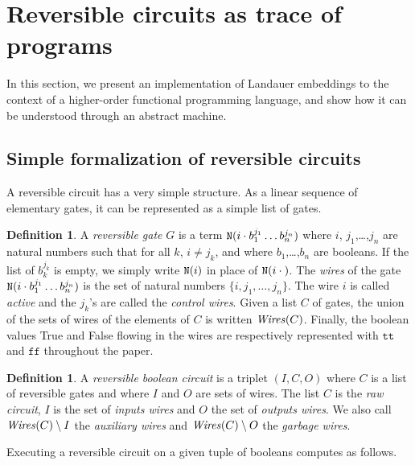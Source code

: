 \documentclass{article}
\theoremstyle{plain}
\theoremstyle{definition}
\newtheorem{definition}[theorem]{Definition}
\newcommand{\cnotgate}[2]{{\tt N}({#1}\cdot{#2})}
\newcommand{\notgate}[1]{{\tt N}({#1})}
\newcommand{\wires}[1]{{\it Wires}({#1})}
\newcommand{\define}[1]{{\em #1}}
\newcommand{\ttrue}{\mathtt{t\!t}}
\newcommand{\ffalse}{\mathtt{f\!f}}
\begin{document}
\section{Reversible circuits as trace of programs}
\label{sec:progr-revers-circ}

In this section, we present an implementation of Landauer embeddings
to the context of a higher-order functional programming language, and
show how it can be understood through an abstract machine.



\subsection{Simple formalization of reversible circuits}

A reversible circuit has a very simple structure. As a linear sequence
of elementary gates, it can be represented as a simple list of gates.

\begin{definition}\rm
  A \define{reversible gate} $G$ is a term 
  $
    \cnotgate{i}{b_1^{j_1}\ldots b_n^{j_n}}
  $
  where $i$, $j_1$,\ldots,$j_n$ are natural numbers such that for all
  $k$, $i\neq j_k$, and where $b_1$,\ldots,$b_n$ are booleans. If the list of
  $b_k^{j_k}$ is empty, we simply write $\notgate{i}$ in place of
  $\cnotgate{i}{}$.
The \define{wires} of the gate
  $\cnotgate{i}{b_1^{j_1}\ldots b_n^{j_n}}$ is the set of natural
  numbers $\{i,j_1,\ldots, j_n\}$. The wire $i$ is called
  \define{active} and the $j_k$'s are called the \define{control
    wires}.
Given a list $C$ of gates, the union of
  the sets of wires of the elements of $C$ is written $\wires{C}$.
  Finally, the boolean values True and False flowing in the wires are
  respectively represented with $\ttrue$ and $\ffalse$ throughout the paper.
\end{definition}


\begin{definition}
  A \define{reversible boolean circuit} is a triplet $(I,C,O)$ where
  $C$ is a list of reversible gates and where $I$ and $O$ are sets of
  wires. The list $C$ is the \define{raw circuit}, $I$ is the set of
  \define{inputs wires} and $O$ the set of \define{outputs wires}. We
  also call $\wires{C}\setminus I$ the \define{auxiliary wires} and
  $\wires{C}\setminus O$ the \define{garbage wires}.
\end{definition}

Executing a reversible circuit on a given tuple of booleans
computes as follows.
\end{document}
